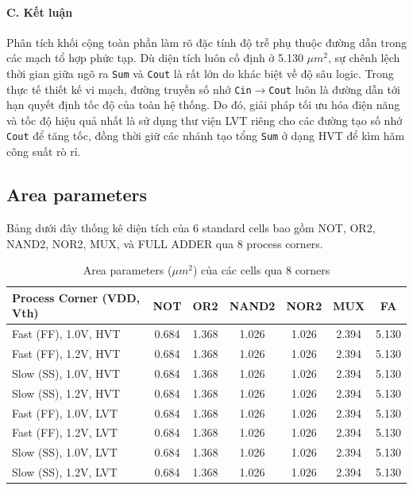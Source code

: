 \documentclass[12pt, a4paper, oneside]{article}
\begin{document}
\paragraph{C. Kết luận} 
Phân tích khối cộng toàn phần làm rõ đặc tính độ trễ phụ thuộc đường dẫn trong các mạch tổ hợp phức tạp. Dù diện tích luôn cố định ở 5.130 $\mu m^2$, sự chênh lệch thời gian giữa ngõ ra \texttt{Sum} và \texttt{Cout} là rất lớn do khác biệt về độ sâu logic. Trong thực tế thiết kế vi mạch, đường truyền số nhớ \texttt{Cin$\rightarrow$Cout} luôn là đường dẫn tới hạn quyết định tốc độ của toàn hệ thống. Do đó, giải pháp tối ưu hóa điện năng và tốc độ hiệu quả nhất là sử dụng thư viện LVT riêng cho các đường tạo số nhớ \texttt{Cout} để tăng tốc, đồng thời giữ các nhánh tạo tổng \texttt{Sum} ở dạng HVT để kìm hãm công suất rò rỉ.

\subsection{Area parameters}

Bảng dưới đây thống kê diện tích của 6 standard cells bao gồm NOT, OR2, NAND2, NOR2, MUX, và FULL ADDER qua 8 process corners.

\begin{table}[H]
    \centering
    \begin{tabular}{|l|c|c|c|c|c|c|}
        \hline
        \textbf{Process Corner (VDD, Vth)} & \textbf{NOT} & \textbf{OR2} & \textbf{NAND2} & \textbf{NOR2} & \textbf{MUX} & \textbf{FA} \\
        \hline
        Fast (FF), 1.0V, HVT & 0.684 & 1.368 & 1.026 & 1.026 & 2.394 & 5.130 \\ \hline
        Fast (FF), 1.2V, HVT & 0.684 & 1.368 & 1.026 & 1.026 & 2.394 & 5.130 \\ \hline
        Slow (SS), 1.0V, HVT & 0.684 & 1.368 & 1.026 & 1.026 & 2.394 & 5.130 \\ \hline
        Slow (SS), 1.2V, HVT & 0.684 & 1.368 & 1.026 & 1.026 & 2.394 & 5.130 \\ \hline
        Fast (FF), 1.0V, LVT & 0.684 & 1.368 & 1.026 & 1.026 & 2.394 & 5.130 \\ \hline
        Fast (FF), 1.2V, LVT & 0.684 & 1.368 & 1.026 & 1.026 & 2.394 & 5.130 \\ \hline
        Slow (SS), 1.0V, LVT & 0.684 & 1.368 & 1.026 & 1.026 & 2.394 & 5.130 \\ \hline
        Slow (SS), 1.2V, LVT & 0.684 & 1.368 & 1.026 & 1.026 & 2.394 & 5.130 \\ \hline
    \end{tabular}
    \caption{Area parameters ($\mu m^2$) của các cells qua 8 corners}
    \label{tab:exp1_area}
\end{table}
\end{document}
